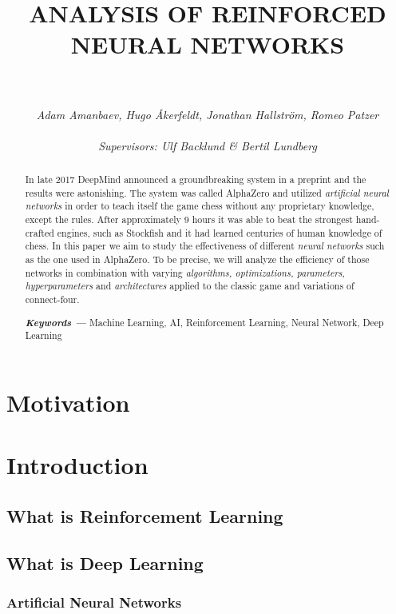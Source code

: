 \documentclass[titlepage]{article}
\title{\textbf{ANALYSIS OF REINFORCED \\NEURAL NETWORKS}}
\author{\rule{8cm}{0.3mm} \\[0.5in] \textit{Adam Amanbaev, Hugo Åkerfeldt, Jonathan Hallström, Romeo Patzer} \\\\
    \small \textit{Supervisors: Ulf Backlund \& Bertil Lundberg}
}
\date{}
\providecommand{\keywords}[1] {
    \small
    \textbf{\textit{Keywords ---}} #1
}
\begin{document}
\maketitle

\newpage

\begin{abstract}
    In late 2017 DeepMind announced a groundbreaking system in a preprint \cite{alphazero} and the results were astonishing. The system was called AlphaZero and utilized \emph{artificial neural networks} in order to teach itself the game chess without any proprietary knowledge, except the rules. After approximately 9 hours it was able to beat the strongest hand-crafted engines, such as Stockfish and it had learned centuries of human knowledge of chess. In this paper we aim to study the effectiveness of different \emph{neural networks} such as the one used in AlphaZero. To be precise, we will analyze the efficiency of those networks in combination with varying \emph{algorithms, optimizations, parameters, hyperparameters} and \emph {architectures} applied to the classic game and variations of connect-four. \\[0.5in]
\centerline{\keywords{Machine Learning, AI, Reinforcement Learning, Neural Network, Deep Learning}}
\end{abstract}

\tableofcontents

\newpage

\section{Motivation}

\newpage

\section{Introduction}

\subsection{What is Reinforcement Learning}
\subsection{What is Deep Learning}
\subsubsection{Artificial Neural Networks}
\end{document}
